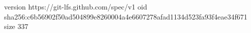 version https://git-lfs.github.com/spec/v1
oid sha256:c6b56902f50ad504899e8260004a4e6607278afad1134d523fa93f4eae34f671
size 337
